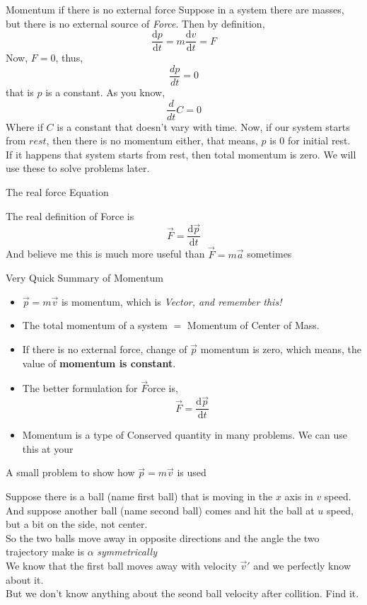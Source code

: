 \documentclass[9pt]{memoir}
\newenvironment{myitemize}{\begin{itemize}}{\end{itemize}}
\newcommand{\prob}[1]{ \begin{problem.} #1 \end{problem.}}
\newcommand{\id}[1]{ \begin{idea} #1 \end{idea} }
\newcommand{\draw}[3]{ \begin{figure}[hbt!] \centering
 \fontsize{35pt}{20pt}\selectfont \resizebox{#1 \textwidth}{!}{
{#2.pdf_tex}}\caption{#3} \label{#3} \end{figure} }
\begin{document}
\begin{frame}{ Momentum if there is no external force} 
    Suppose in a system there are masses, but there is no external source of \emph{Force}. Then by definition,  
    \[ \frac{\mathrm d p}{\mathrm d t} = m \frac{\mathrm d v}{ \mathrm d t} = F \]
    Now, $F=0$, thus, \[ \frac{dp}{dt}=0 \] that is $p$ is a constant. 
    As you know, \[ \frac{d}{dt} C =0 \]
    Where if $C$ is a constant that doesn't vary with time. Now, if our system starts from $rest$, then there is no momentum either, that means,  $p$ is $0$ for initial rest. \\ 
    If it happens that system starts from rest, then total momentum is zero. We will use these to solve problems later. 
\end{frame}
%
%
\begin{frame}
    {The real force Equation}
    \id{The real definition of Force is 
        \[ \vec F= \frac{\mathrm d \vec p}{\mathrm d t} \]
    And believe me this is much more useful than $\vec F = m \vec a$ sometimes} 
\end{frame}

\begin{frame}
    {Very Quick Summary of Momentum}
    \begin{myitemize}
    \item $\vec p = m \vec v$ is momentum, which is \emph{Vector, and remember this!}
    \item The total momentum of a system $=$ Momentum of Center of Mass. 
    \item If there is no external force, change of $\vec p$ momentum is zero, which means, the value of \textbf{momentum is constant}. 
    \item The better formulation for $\vec F$orce is, 
        \[ \vec F = \frac{\mathrm d \vec p}{\mathrm d t} \]
    \item Momentum is a type of Conserved quantity in many problems. We can use this at your    
    \end{myitemize}
\end{frame}




\begin{frame}
    {A small problem to show how $\vec p = m \vec v$ is used}
    {
        \prob{ 
            Suppose there is a ball (name first ball) that is moving in the $x$ axis in $v$ speed. And suppose another ball (name second ball) comes and hit the ball at $u$ speed, but a bit on the side, not center.\\ 
            So the two balls move away in opposite directions and the angle the two trajectory make is $\alpha$ \emph{symmetrically} \\ 
            We know that the first ball moves away with velocity $\vec v'$ and we perfectly know about it. \\

        But we don't know anything about the seond ball velocity after collition. Find it.}}{ 
    \draw{1}{prob4_1}{ 
}}
\end{frame}
\end{document}
